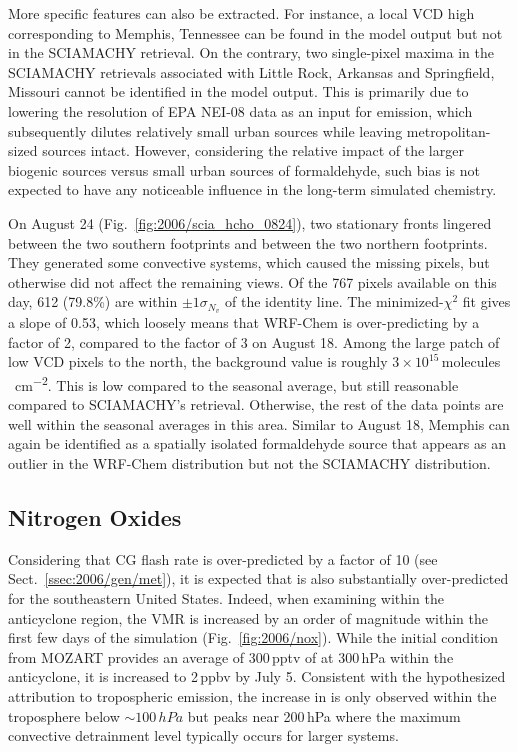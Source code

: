 More specific features can also be extracted. For instance, a  local VCD high corresponding to Memphis, Tennessee can be found in the model output but not in the
SCIAMACHY retrieval. On the contrary, two single-pixel maxima in the SCIAMACHY retrievals associated with Little Rock, Arkansas and Springfield, Missouri cannot be identified
in the model output. This is primarily due to lowering the resolution of EPA NEI-08 data as an input for emission, which subsequently dilutes relatively small urban sources while
leaving metropolitan-sized sources intact. However, considering the relative impact of the larger biogenic sources versus small urban sources of formaldehyde, such bias is not expected
to have any noticeable influence in the long-term simulated chemistry.

On August 24 (Fig.~\ref{fig:2006/scia_hcho_0824}), two stationary fronts lingered between the two southern footprints and between the two northern footprints. They generated
some convective systems, which caused the missing pixels, but otherwise did not affect the remaining views. Of the 767 pixels available on this day, 612 (79.8\%) are within $\pm1\sigma_{N_v}$
of the identity line. The minimized-$\chi^2$ fit gives a slope of 0.53, which loosely means that WRF-Chem is over-predicting by a factor of 2, compared to the factor of 3 on August 18.
Among the large patch of low VCD pixels to the north, the background value is roughly $3\times10^{15}$\,\unit{molecules\,cm^{-2}}. This is low compared to the \citet{Millet:2008oq}
seasonal average, but still reasonable compared to SCIAMACHY's retrieval. Otherwise, the rest of the data points are well within the seasonal averages in this area. Similar to August 18,
Memphis can again be identified as a spatially isolated formaldehyde source that appears as an outlier in the WRF-Chem distribution but not the SCIAMACHY distribution.

\subsection{Nitrogen Oxides}\label{ssec:2006/gen/nox}

Considering that CG flash rate is over-predicted by a factor of 10 (see Sect.~\ref{ssec:2006/gen/met}), it is expected
that  is also substantially over-predicted for the southeastern United States. Indeed, when examining
within the anticyclone region,  the  VMR is increased by an order of magnitude  within the first few days
of the simulation (Fig.~\ref{fig:2006/nox}). While the initial condition from MOZART provides an average of 300\,\unit{pptv}
of  at 300\,\unit{hPa} within the anticyclone, it is increased to 2\,\unit{ppbv} by July 5. Consistent with the hypothesized attribution to tropospheric
{\lnox} emission, the increase in  is only observed within the troposphere below $\sim100\,\unit{hPa}$
but peaks near 200\,\unit{hPa} where the maximum convective detrainment level typically occurs for larger systems.

